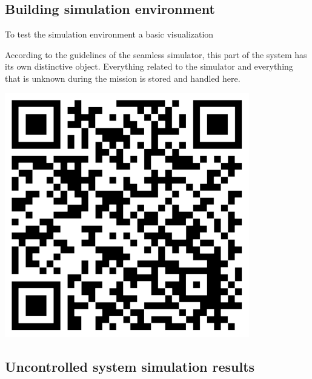 \subsection{Building simulation environment}

To test the simulation environment a basic visualization

\begin{tcolorbox}[colback=cyan!5,colframe=cyan!40!black,title=Code: Simulator.py \\ https://www.dropbox.com/s/agron9anslev6xw/Simulator.py]
\begin{minipage}{0,6\textwidth}
According to the guidelines of the seamless simulator, this part of the system has its own distinctive object. Everything related to the simulator and everything that is unknown during the mission is stored and handled here.
\end{minipage}
\begin{minipage}{0,35\textwidth}
\raggedleft
\includegraphics[width=0.8\textwidth]{img/simulatorcode}
\end{minipage}
\end{tcolorbox}

\subsection{Uncontrolled system simulation results}
